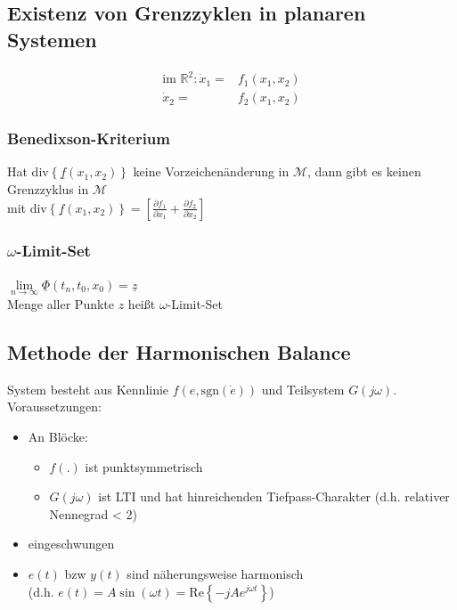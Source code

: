 \documentclass[german]{latex4ei/latex4ei_sheet}
\begin{document}
\subsection{Existenz von Grenzzyklen in planaren Systemen}

\begin{align*}
  \text{im $\mathbb{R}^2$:} \,
  \dot{x}_1 =&  f_1(x_1, x_2) \\
  \dot{x}_2 =&  f_2(x_1, x_2)
\end{align*}

\subsubsection*{Benedixson-Kriterium}
Hat div$\left\{ \underline{f}(x_1, x_2) \right\}$ keine Vorzeichenänderung in $\mathcal{M}$, dann gibt es keinen Grenzzyklus in $\mathcal{M}$ \\
mit $\text{div}\left\{ \underline{f}(x_1, x_2) \right\} = \left[ \frac{\partial f_1}{\partial x_1} + \frac{\partial f_2}{ \partial x_2} \right]$

\subsubsection*{$\omega$-Limit-Set}

$\lim\limits_{n \rightarrow \infty} \underline{\Phi} (t_n, t_0, x_0) = \underline{z}$ \\
Menge aller Punkte $z$ heißt $\omega$-Limit-Set

\subsection{Methode der Harmonischen Balance}

System besteht aus Kennlinie $f(e, \text{sgn}(\dot{e}))$ und Teilsystem $G(j\omega)$. \\
Voraussetzungen:
\begin{itemize}
  \item An Blöcke:
    \begin{itemize}
      \item $f(.)$ ist punktsymmetrisch
      \item $G(j\omega)$ ist LTI und hat hinreichenden Tiefpass-Charakter (d.h. relativer Nennegrad < 2)
    \end{itemize}
  \item eingeschwungen
  \item $e(t)$ bzw $y(t)$ sind näherungsweise harmonisch \\ (d.h. $e(t) = A \sin(\omega t) = \text{Re} \left\{ -j A e^{j\omega t} \right\}$)
\end{itemize}
\end{document}
